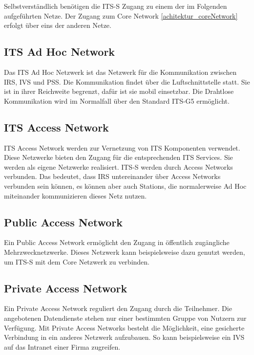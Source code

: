 Selbstverständlich benötigen die \ac{ITS-S} Zugang zu einem der im Folgenden aufgeführten Netze. Der Zugang zum Core Network \ref{achitektur_coreNetwork} erfolgt über eins der anderen Netze. 

\subsection{ITS Ad Hoc Network\label{achitektur_adHocNetwork}}
Das \ac{ITS} Ad Hoc Netzwerk ist das Netzwerk für die Kommunikation zwischen \ac{IRS}, \ac{IVS} und \ac{PSS}. Die Kommunikation findet über die Luftschnittstelle statt. Sie ist in ihrer Reichweite begrenzt, dafür ist sie mobil einsetzbar. Die Drahtlose Kommunikation wird im Normalfall über den Standard ITS-G5 ermöglicht.


\subsection{ITS Access Network \label{architektur_itsAccessNetwork}}
ITS Access Network werden zur Vernetzung von \ac{ITS} Komponenten verwendet. Diese Netzwerke bieten den Zugang für die entsprechenden \ac{ITS} Services. Sie werden als eigene Netzwerke realisiert. \ac{ITS-S} werden durch Access Networks verbunden. Das bedeutet, dass \ac{IRS} untereinander über Access Networks verbunden sein können, es können aber auch Stations, die normalerweise Ad Hoc miteinander kommunizieren dieses Netz nutzen. 

\subsection{Public Access Network}
Ein Public Access Network ermöglicht den Zugang in öffentlich zugängliche Mehrzwecknetzwerke. Dieses Netzwerk kann beispielsweise dazu genutzt werden, um \ac{ITS-S} mit dem Core Netzwerk zu verbinden. 

\subsection{Private Access Network}
Ein Private Access Network reguliert den Zugang durch die Teilnehmer. Die angebotenen Datendienste stehen nur einer bestimmten Gruppe von Nutzern zur Verfügung. Mit Private Access Networks besteht die Möglichkeit, eine gesicherte Verbindung in ein anderes Netzwerk aufzubauen. So kann beispielsweise ein \ac{IVS} auf das Intranet einer Firma zugreifen. 

